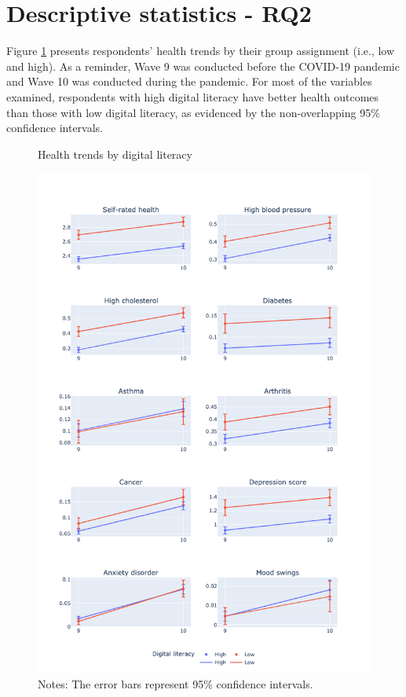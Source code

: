 \section{Descriptive statistics - RQ2}
Figure \ref{fig:desc_stats_rq2} presents respondents' health trends by their group assignment (i.e., low and high). As a reminder, Wave 9 was conducted before the COVID-19 pandemic and Wave 10 was conducted during the pandemic. For most of the variables examined, respondents with high digital literacy have better health outcomes than those with low digital literacy, as evidenced by the non-overlapping 95\% confidence intervals.

\begin{figure}
    \centering
    \caption{Health trends by digital literacy}
    \label{fig:desc_stats_rq2}
    \includegraphics[width=\textwidth]{figures/desc_stats_q2.png}
    \caption*{Notes: The error bars represent 95\% confidence intervals.}
\end{figure}

